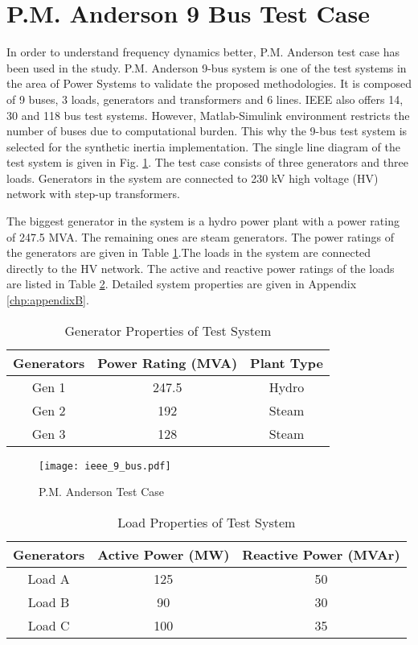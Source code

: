 \section{P.M. Anderson 9 Bus Test Case}
In order to understand frequency dynamics better, P.M. Anderson test case has been used in the study. P.M. Anderson 9-bus system is one of the test systems in the area of Power Systems to validate the proposed methodologies. It is composed of 9 buses, 3 loads, generators and transformers and 6 lines. IEEE also offers 14, 30 and 118 bus test systems. However, Matlab-Simulink environment restricts the number of buses due to computational burden. This why the 9-bus test system is selected for the synthetic inertia implementation. The single line diagram of the test system is given in Fig. \ref{ieee_9_bus}. The test case consists of three generators and three loads. Generators in the system are connected to 230 kV high voltage (HV) network with step-up transformers.\par
The biggest generator in the system is a hydro power plant with a power rating of 247.5 MVA. The remaining ones are steam generators. The power ratings of the generators are given in Table \ref{generatorproperties}.The loads in the system are connected directly to the HV network. The active and reactive power ratings of the loads are listed in Table \ref{loadproperties}. Detailed system properties are given in Appendix \ref{chp:appendixB}.
\begin{table}[h]
	\centering
	\begin{tabular}{ccc}
		\hline
		\textbf{Generators} & \textbf{Power Rating (MVA)} & \textbf{Plant Type} \\ \hline
		Gen 1               & 247.5                       & Hydro				\\
		Gen 2               & 192                         & Steam               \\
		Gen 3               & 128                         & Steam               \\ \hline
	\end{tabular}
	\caption{Generator Properties of Test System}
	\label{generatorproperties}
\end{table}
\begin{figure}[h]
	\centering
	\texttt{[image: ieee\_9\_bus.pdf]}
	\caption[P.M. Anderson Test Case]{P.M. Anderson Test Case \cite{P.M.1995}}
	\label{ieee_9_bus}
\end{figure}
\begin{table}[h!]
	\centering
	\begin{tabular}{ccc}
		\hline
		\textbf{Generators} & \textbf{Active Power (MW)}  & \textbf{Reactive Power (MVAr)} \\ \hline
		Load A              & 125                      	  & 50				 \\
		Load B              & 90                          & 30                \\
		Load C              & 100                         & 35                \\ \hline
	\end{tabular}
	\caption{Load Properties of Test System}
	\label{loadproperties}
\end{table}
